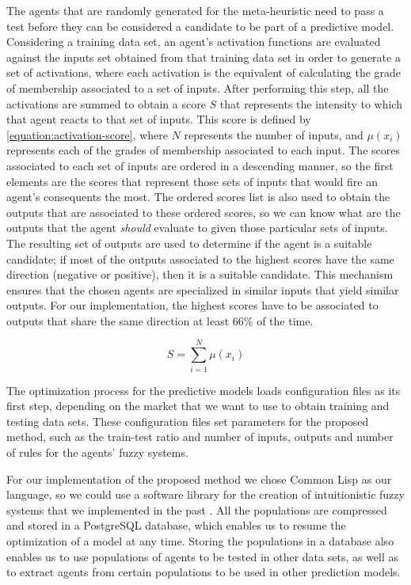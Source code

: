 ﻿\documentclass{ieeeaccess}
\begin{document}
The agents that are randomly generated for the meta-heuristic need to
pass a test before they can be considered a candidate to be part of a
predictive model. Considering a training data set, an agent's
activation functions are evaluated against the inputs set obtained
from that training data set in order to generate a set of activations,
where each activation is the equivalent of calculating the grade of
membership associated to a set of inputs. After performing this step,
all the activations are summed to obtain a score $S$ that represents
the intensity to which that agent reacts to that set of inputs. This
score is defined by \ref{equation:activation-score}, where $N$
represents the number of inputs, and $\mu(x_{i})$ represents each of
the grades of membership associated to each input. The scores
associated to each set of inputs are ordered in a descending manner,
so the first elements are the scores that represent those sets of
inputs that would fire an agent's consequents the most. The ordered
scores list is also used to obtain the outputs that are associated to
these ordered scores, so we can know what are the outputs that the
agent \textit{should} evaluate to given those particular sets of
inputs. The resulting set of outputs are used to determine if the
agent is a suitable candidate; if most of the outputs associated to
the highest scores have the same direction (negative or positive),
then it is a suitable candidate. This mechanism ensures that the
chosen agents are specialized in similar inputs that yield similar
outputs. For our implementation, the highest scores have to be
associated to outputs that share the same direction at least 66\% of
the time. %

\begin{equation}
  \label{equation:activation-score}
  S =\sum_{i=1}^{N}{\mu(x_{i})}
\end{equation}

The optimization process for the predictive models loads configuration
files as its first step, depending on the market that we want to use
to obtain training and testing data sets. These configuration files
set parameters for the proposed method, such as the train-test ratio
and number of inputs, outputs and number of rules for the agents'
fuzzy systems.

For our implementation of the proposed method we chose Common Lisp as
our language, so we could use a software library for the creation of
intuitionistic fuzzy systems that we implemented in the past
\cite{Hernandez-Aguila2016} \cite{Hernandez-Aguila2017-2}. All the
populations are compressed and stored in a PostgreSQL database, which
enables us to resume the optimization of a model at any
time. Storing the populations in a database also enables us to use
populations of agents to be tested in other data sets, as well as to
extract agents from certain populations to be used in other prediction
models. %
\end{document}
